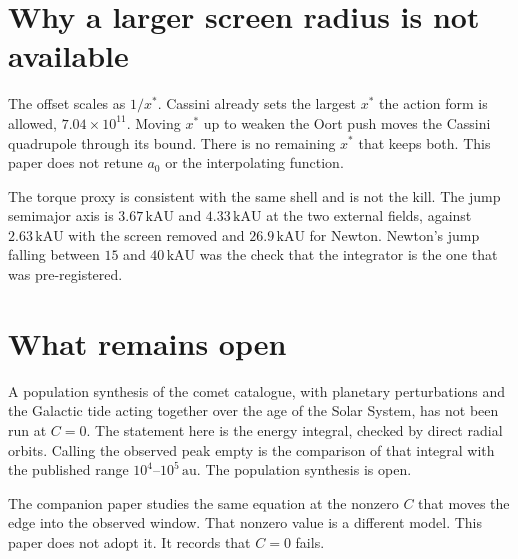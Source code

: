 \section{Why a larger screen radius is not available}

The offset scales as \(1/x^*\). Cassini already sets the largest \(x^*\) the action form is allowed, \(7.04\times10^{11}\). Moving \(x^*\) up to weaken the Oort push moves the Cassini quadrupole through its bound. There is no remaining \(x^*\) that keeps both. This paper does not retune \(a_0\) or the interpolating function.

The torque proxy is consistent with the same shell and is not the kill. The jump semimajor axis is \(3.67\,\mathrm{kAU}\) and \(4.33\,\mathrm{kAU}\) at the two external fields, against \(2.63\,\mathrm{kAU}\) with the screen removed and \(26.9\,\mathrm{kAU}\) for Newton. Newton's jump falling between \(15\) and \(40\,\mathrm{kAU}\) was the check that the integrator is the one that was pre-registered.

\section{What remains open}

A population synthesis of the comet catalogue, with planetary perturbations and the Galactic tide acting together over the age of the Solar System, has not been run at \(C=0\). The statement here is the energy integral, checked by direct radial orbits. Calling the observed peak empty is the comparison of that integral with the published range \(10^{4}\)--\(10^{5}\,\mathrm{au}\). The population synthesis is open.

The companion paper studies the same equation at the nonzero \(C\) that moves the edge into the observed window. That nonzero value is a different model. This paper does not adopt it. It records that \(C=0\) fails.

